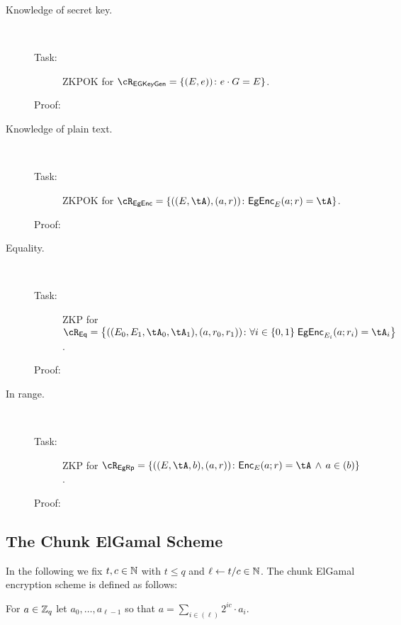 	
\begin{description}
	\item[Knowledge of secret key.] ~
    


\begin{description}
	\item[Task:] ZKPOK for $\rEgKeyGen = \rEgKeyGenDef$.
	
\item[Proof:] 
\end{description}


\item[Knowledge of plain text.] ~

\begin{description}
	\item[Task:] ZKPOK for $\rEGEnc=\rEGEncDef$.
	
	\item[Proof:] 
	
\end{description}


\item[Equality.] ~
\begin{description}
	\item[Task:] ZKP for $\rEgEq =\rEgEqDef$.
	
	\item[Proof:] 
\end{description}


\item[In range.] ~
\begin{description}
	\item[Task:] ZKP for $\rEgRp =\rEgRpDef$.
	
	\item[Proof:] 
\end{description}



\end{description}

	
\subsection{The Chunk ElGamal  Scheme}\label{sec:ChanksEG:EGScheme}
In the following we fix $t,c\in {\mathbb{N}}$ with $t\le q$ and $\ell \leftarrow t/c \in {\mathbb{N}}$. The chunk ElGamal encryption scheme  is defined as follows:


\newcommand{\basefactor}{\MathAlgX{baseF}}
\begin{definition}\label{def:basefactor}
For $a\in {\mathbb Z}_q$ let $a_0,\ldots,a_{\ell-1}$ so that $a =  \sum_{i \in (\ell)}    2^{i c} \cdot a_i$.
\end{definition}

